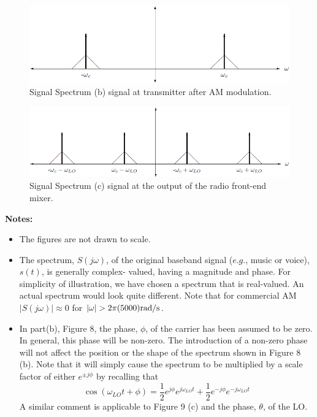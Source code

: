 \documentclass[a4paper]{article}
\begin{document}
\begin{figure}[H]
	\centering
	\includegraphics[width=0.7\linewidth]{8.png}
	\caption{Signal Spectrum (b) signal at transmitter after AM modulation.}
\end{figure}
\begin{figure}[H]
	\centering
	\includegraphics[width=0.7\linewidth]{9.png}
	\caption{Signal Spectrum  (c) signal at the output of the radio front-end mixer.}
\end{figure}
\textbf{Notes:}
\begin{itemize}
	\item The figures are not drawn to scale.
	\item The spectrum, $S(j\omega)$, of the original baseband signal ($e.g.$, music or voice), $s(t)$, is generally complex- valued, having a magnitude and phase. For simplicity of illustration, we have chosen a spectrum that is real-valued. An actual spectrum would look quite different. Note that for commercial AM $|S(j\omega)|\approx0$ for $|\omega|>2\pi(5000)\rm{rad/s}$.
	\item In part(b), Figure 8, the phase, $\phi$, of the carrier has been assumed to be zero. In general, this phase will be non-zero. The introduction of a non-zero phase will not affect the position or the shape of the spectrum shown in Figure 8 (b). Note that it will simply cause the spectrum to be multiplied by a scale factor of either $e^{\pm j\phi}$ by recalling that
	$$\cos(\omega_{LO}t+\phi)=\frac{1}{2}e^{j\phi}e^{j\omega_{LO}t}+\frac{1}{2}e^{-j\phi}e^{-j\omega_{LO}t}$$
	A similar comment is applicable to Figure 9 (c) and the phase, $\theta$, of the LO.
\end{itemize}
\end{document}
